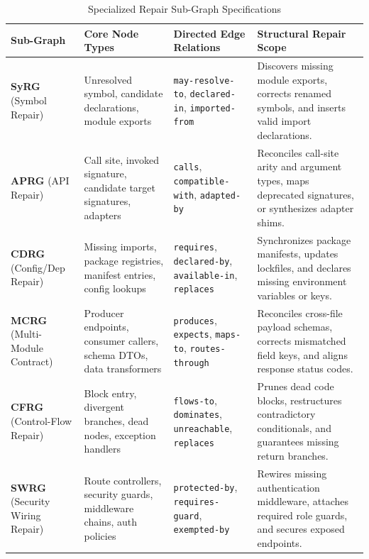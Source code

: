 \documentclass[10pt,a4paper]{article}
\begin{document}
\begin{table}[h!]
\centering
\scriptsize
\caption{Specialized Repair Sub-Graph Specifications}
\label{tab:repair_graphs}
\begin{tabularx}{\textwidth}{l p{3.2cm} p{3.5cm} X}
\toprule
\textbf{Sub-Graph} & \textbf{Core Node Types} & \textbf{Directed Edge Relations} & \textbf{Structural Repair Scope} \\
\midrule
\textbf{SyRG} (Symbol Repair) & Unresolved symbol, candidate declarations, module exports & \texttt{may-resolve-to}, \texttt{declared-in}, \texttt{imported-from} & Discovers missing module exports, corrects renamed symbols, and inserts valid import declarations. \\
\textbf{APRG} (API Repair) & Call site, invoked signature, candidate target signatures, adapters & \texttt{calls}, \texttt{compatible-with}, \texttt{adapted-by} & Reconciles call-site arity and argument types, maps deprecated signatures, or synthesizes adapter shims. \\
\textbf{CDRG} (Config/Dep Repair) & Missing imports, package registries, manifest entries, config lookups & \texttt{requires}, \texttt{declared-by}, \texttt{available-in}, \texttt{replaces} & Synchronizes package manifests, updates lockfiles, and declares missing environment variables or keys. \\
\textbf{MCRG} (Multi-Module Contract) & Producer endpoints, consumer callers, schema DTOs, data transformers & \texttt{produces}, \texttt{expects}, \texttt{maps-to}, \texttt{routes-through} & Reconciles cross-file payload schemas, corrects mismatched field keys, and aligns response status codes. \\
\textbf{CFRG} (Control-Flow Repair) & Block entry, divergent branches, dead nodes, exception handlers & \texttt{flows-to}, \texttt{dominates}, \texttt{unreachable}, \texttt{replaces} & Prunes dead code blocks, restructures contradictory conditionals, and guarantees missing return branches. \\
\textbf{SWRG} (Security Wiring Repair) & Route controllers, security guards, middleware chains, auth policies & \texttt{protected-by}, \texttt{requires-guard}, \texttt{exempted-by} & Rewires missing authentication middleware, attaches required role guards, and secures exposed endpoints. \\
\bottomrule
\end{tabularx}
\end{table}
\end{document}
